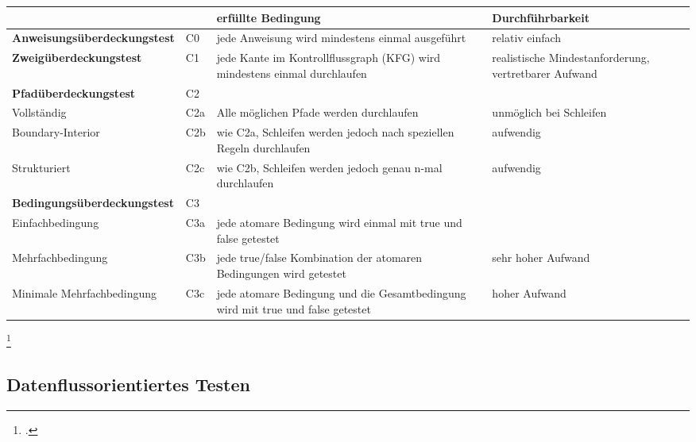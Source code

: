 \documentclass{bschlangaul-theorie}
\begin{document}
{
\footnotesize
\noindent
\begin{tabular}{llL{4cm}L{3cm}}
&
&
\textbf{erfüllte Bedingung} &
\textbf{Durchführbarkeit}
\\

\hline

%

\textbf{Anweisungsüberdeckungstest}
&
C0 &
jede Anweisung wird mindestens einmal ausgeführt &
relativ einfach \\

\hline

%

\textbf{Zweigüberdeckungstest} &
C1 &
jede Kante im Kontrollflussgraph (KFG) wird mindestens einmal durchlaufen &
realistische Mindestanforderung, vertretbarer Aufwand \\

\hline

%

\textbf{Pfadüberdeckungstest} &
C2 &
&
\\

Vollständig &
C2a &
Alle möglichen Pfade werden durchlaufen &
unmöglich bei Schleifen \\

Boundary-Interior &
C2b &
wie C2a, Schleifen werden jedoch nach speziellen Regeln durchlaufen &
aufwendig \\

Strukturiert &
C2c &
wie C2b, Schleifen werden jedoch genau n-mal durchlaufen &
aufwendig \\

\hline

%

\textbf{Bedingungsüberdeckungstest} &
C3 &
&
\\

Einfachbedingung &
C3a &
jede atomare Bedingung wird einmal mit true und false getestet &
\\

Mehrfachbedingung &
C3b &
jede true/false Kombination der atomaren Bedingungen wird getestet &
sehr hoher Aufwand \\

Minimale Mehrfachbedingung &
C3c &
jede atomare Bedingung und die Gesamtbedingung wird mit true und false getestet &
hoher Aufwand\\
\end{tabular}\footcite{wiki:kontrollfluss-test}
}

%

\subsection{Datenflussorientiertes Testen}
\end{document}
